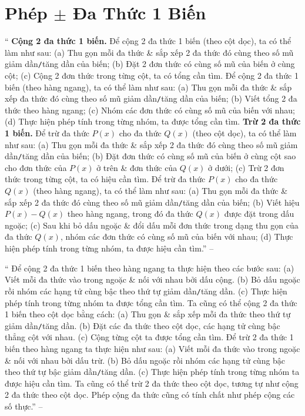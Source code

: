 \documentclass{article}
\numberwithin{equation}{section}
\begin{document}

\section{Phép $\pm$ Đa Thức 1 Biến}
`` \textbf{Cộng 2 đa thức 1 biến.} Để cộng 2 đa thức 1 biến (theo cột dọc), ta có thể làm như sau: (a) Thu gọn mỗi đa thức \& sắp xếp 2 đa thức đó cùng theo số mũ giảm dần\texttt{/}tăng dần của biến; (b) Đặt 2 đơn thức có cùng số mũ của biến ở cùng cột; (c) Cộng 2 đơn thức trong từng cột, ta có tổng cần tìm. Để cộng 2 đa thức 1 biến (theo hàng ngang), ta có thể làm như sau: (a) Thu gọn mỗi đa thức \& sắp xếp đa thức đó cùng theo số mũ giảm dần\texttt{/}tăng dần của biến; (b) Viết tổng 2 đa thức theo hàng ngang; (c) Nhóm các đơn thức có cùng số mũ của biến với nhau; (d) Thực hiện phép tính trong từng nhóm, ta được tổng cần tìm.  \textbf{Trừ 2 đa thức 1 biến.} Để trừ đa thức $P(x)$ cho đa thức $Q(x)$ (theo cột dọc), ta có thể làm như sau: (a) Thu gọn mỗi đa thức \& sắp xếp 2 đa thức đó cùng theo số mũ giảm dần\texttt{/}tăng dần của biến; (b) Đặt đơn thức có cùng số mũ của biến ở cùng cột sao cho đơn thức của $P(x)$ ở trên \& đơn thức của $Q(x)$ ở dưới; (c) Trừ 2 đơn thức trong từng cột, ta có hiệu cần tìm. Để trừ đa thức $P(x)$ cho đa thức $Q(x)$ (theo hàng ngang), ta có thể làm như sau: (a) Thu gọn mỗi đa thức \& sắp xếp 2 đa thức đó cùng theo số mũ giảm dần\texttt{/}tăng dần của biến; (b) Viết hiệu $P(x) - Q(x)$ theo hàng ngang, trong đó đa thức $Q(x)$ được đặt trong dấu ngoặc; (c) Sau khi bỏ dấu ngoặc \& đổi dấu mỗi đơn thức trong dạng thu gọn của đa thức $Q(x)$, nhóm các đơn thức có cùng số mũ của biến với nhau; (d) Thực hiện phép tính trong từng nhóm, ta được hiệu cần tìm.'' -- \cite[\S3, pp. 44--45]{SBT_Toan_7_Canh_Dieu_tap_2}

`` Để cộng 2 đa thức 1 biến theo hàng ngang ta thực hiện theo các bước sau: (a) Viết mỗi đa thức vào trong ngoặc \& nối với nhau bởi dấu cộng. (b) Bỏ dấu ngoặc rồi nhóm các hạng tử cùng bậc theo thứ tự giảm dần\texttt{/}tăng dần. (c) Thực hiện phép tính trong từng nhóm ta được tổng cần tìm. Ta cũng có thể cộng 2 đa thức 1 biến theo cột dọc bằng cách: (a) Thu gọn \& sắp xếp mỗi đa thức theo thứ tự giảm dần\texttt{/}tăng dần. (b) Đặt các đa thức theo cột dọc, các hạng tử cùng bậc thẳng cột với nhau. (c) Cộng từng cột ta được tổng cần tìm.  Để trừ 2 đa thức 1 biến theo hàng ngang ta thực hiện như sau: (a) Viết mỗi đa thức vào trong ngoặc \& nối với nhau bởi dấu trừ. (b) Bỏ dấu ngoặc rồi nhóm các hạng tử cùng bậc theo thứ tự bậc giảm dần\texttt{/}tăng dần. (c) Thực hiện phép tính trong từng nhóm ta được hiệu cần tìm. Ta cũng có thể trừ 2 đa thức theo cột dọc, tương tự như cộng 2 đa thức theo cột dọc.  Phép cộng đa thức cũng có tính chất như phép cộng các số thực.'' -- \cite[Chap. III, \S3, p. 42]{Tuyen_Toan_7}
\end{document}
